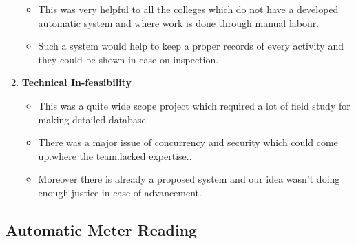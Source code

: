 \documentclass[fleqn,10pt]{../SelfArx} %
\begin{document}
\begin{enumerate}
\begin{itemize}
\item This was very helpful to all the colleges which do not have a developed automatic system and where work is done through manual labour.

\item Such a system would help to keep a proper records of every activity and they could be shown in case on inspection.
\end{itemize}

\item \textbf{Technical In-feasibility}
\begin{itemize}

\item
This was a quite wide scope project which required a lot of field study for making detailed database.
\item
There was a major issue of concurrency and security which could come up.where the team.lacked expertise..
\item
Moreover there is already a proposed system and our idea wasn't doing enough justice in case of advancement.
\end{itemize}
\end{enumerate}

\subsection{Automatic Meter Reading}
\end{document}
